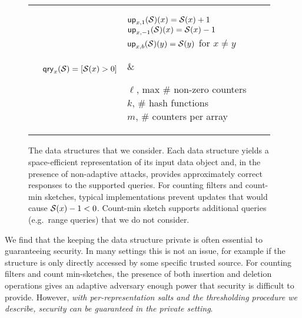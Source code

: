\begin{figure*}[tp]
\begin{center}
\begin{tabular}{ |p{1.75cm} | p{2.5cm} | p{2.95cm} | p{4cm} | p{3.7cm}|}
          & $\mathsf{qry}_x(\mathcal{S}) = [\mathcal{S}(x) > 0]$
          & \parbox[c][10ex]{4cm}{$\mathsf{up}_{x,1}(\mathcal{S})(x) = \mathcal{S}(x)+1$ \\ $\mathsf{up}_{x,-1}(\mathcal{S})(x) = \mathcal{S}(x)-1$ \\ $\mathsf{up}_{x,b}(\mathcal{S})(y) = \mathcal{S}(y)$ for $x \neq y$}
          & \parbox[c]{3.5cm}{$\ell$, max \# non-zero counters\\$k$,
          \# hash functions\\$m$, \# counters per array}
         \\ \hline
  \end{tabular}
\caption{The data structures that we consider. Each data structure yields a
space-efficient representation of its input data object and, in the presence of
non-adaptive attacks, provides approximately correct responses to the supported
queries.  For counting filters and count-min sketches, typical
implementations prevent updates that would cause $\mathcal{S}(x)-1 <
0$. Count-min sketch supports additional queries (e.g.\ range queries)
that we do not consider.}
  \label{fig:structures-summary}
  \label{fig:tab-structures}
\end{center}
\end{figure*}

%
We find that the keeping the data structure private is often essential to guaranteeing security. In many settings this is not an issue, for example if the structure is only directly accessed by some specific trusted source. For counting filters and count min-sketches, the presence of both insertion and deletion operations gives an adaptive adversary enough power that security is difficult to provide. However, \emph{with per-representation salts and the thresholding procedure we describe, security can be guaranteed in the private setting}.

